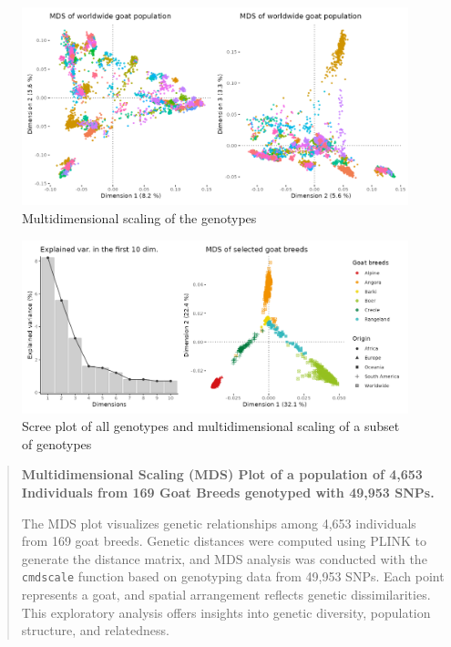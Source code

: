 \begin{figure}
\centering
\includegraphics[width=\linewidth]{Figures/goat_mds_12.png}
\caption{Multidimensional scaling of the genotypes}
\end{figure}

\begin{figure}
\centering
\includegraphics[width=\linewidth]{Figures/goat_mds_eigen_filter.png}
\caption{Scree plot of all genotypes and multidimensional scaling of a
subset of genotypes}
\end{figure}

\begin{quote}
\textbf{Multidimensional Scaling (MDS) Plot of a population of 4,653
Individuals from 169 Goat Breeds genotyped with 49,953 SNPs.}

The MDS plot visualizes genetic relationships among 4,653 individuals
from 169 goat breeds. Genetic distances were computed using PLINK to
generate the distance matrix, and MDS analysis was conducted with the
\texttt{cmdscale} function based on genotyping data from 49,953 SNPs.
Each point represents a goat, and spatial arrangement reflects genetic
dissimilarities. This exploratory analysis offers insights into genetic
diversity, population structure, and relatedness.
\end{quote}

